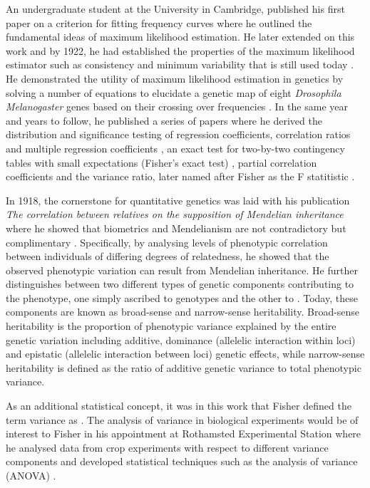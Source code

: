 An undergraduate student at the University in Cambridge, \citet{Fisher1912} published his first paper on a criterion for fitting frequency curves where he outlined the fundamental ideas of maximum likelihood estimation. He later extended on this work and by 1922, he had established the properties of the maximum likelihood estimator such as consistency and minimum variability \citep{Fisher1922a} that is still used today \citep{Hald1999}. He demonstrated the utility of maximum likelihood estimation in genetics by solving a number of equations to elucidate a genetic map of eight \textit{Drosophila Melanogaster} genes based on their crossing over frequencies \citep{Fisher1922b}. In the same year and years to follow, he published a series of papers where he derived the distribution and significance testing of regression coefficients, correlation ratios and multiple regression coefficients \citep{Fisher1922c,Fisher1928}, an exact test for two-by-two contingency tables with small expectations (Fisher's exact test) \citep{Fisher1922d}, partial correlation coefficients \citep{Fisher1924a} and the variance ratio, later named after Fisher as the F statitistic \citep{Fisher1924b}. 

In 1918, the cornerstone for quantitative genetics was laid with his publication \textit{The correlation between relatives on the supposition of Mendelian inheritance} where he showed that biometrics and Mendelianism are not contradictory but complimentary \citep{Fisher1918}. Specifically, by analysing levels of phenotypic correlation between individuals of differing degrees of relatedness, he showed that the observed phenotypic variation can result from Mendelian inheritance. He further distinguishes between two different types of genetic components contributing to the phenotype, one simply ascribed to genotypes and the other to . Today, these components are known as broad-sense and narrow-sense heritability. Broad-sense heritability is the proportion of phenotypic variance explained by the entire genetic variation including additive, dominance (allelelic interaction within loci) and epistatic (allelelic interaction between loci) genetic effects, while narrow-sense heritability is defined as the ratio of additive genetic variance to total phenotypic variance. 

As an additional statistical concept, it was in this work that Fisher defined the term variance as . The analysis of variance in biological experiments would be of interest to Fisher in his appointment at Rothamsted Experimental Station where he analysed data from crop experiments with respect to different variance components and developed statistical techniques such as the analysis of variance (ANOVA) \citep{Fisher1921,Fisher1923,Eden1929}. 

